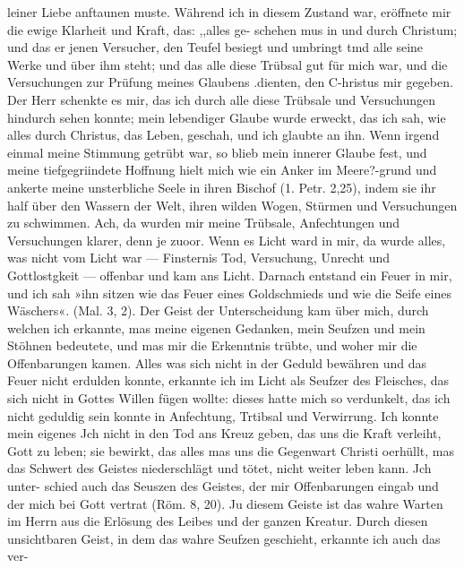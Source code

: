 leiner Liebe anftaunen muste. Während ich in diesem Zustand
war, eröffnete mir die ewige Klarheit und Kraft, das: ,,alles ge-
schehen mus in und durch Christum; und das er jenen Versucher,
den Teufel besiegt und umbringt tmd alle seine Werke und über
ihm steht; und das alle diese Trübsal gut für mich war, und
die Versuchungen zur Prüfung meines Glaubens .dienten, den
C-hristus mir gegeben. Der Herr schenkte es mir, das ich durch
alle diese Trübsale und Versuchungen hindurch sehen konnte;
mein lebendiger Glaube wurde erweckt, das ich sah, wie alles
durch Christus, das Leben, geschah, und ich glaubte an ihn. Wenn
irgend einmal meine Stimmung getrübt war, so blieb mein innerer
Glaube fest, und meine tiefgegriindete Hoffnung hielt mich wie
ein Anker im Meere?-grund und ankerte meine unsterbliche Seele
in ihren Bischof (1. Petr. 2,25), indem sie ihr half über den Wassern
der Welt, ihren wilden Wogen, Stürmen und Versuchungen zu
schwimmen. Ach, da wurden mir meine Trübsale, Anfechtungen
und Versuchungen klarer, denn je zuoor. Wenn es Licht ward
in mir, da wurde alles, was nicht vom Licht war — Finsternis
Tod, Versuchung, Unrecht und Gottlostgkeit — offenbar und kam
ans Licht. Darnach entstand ein Feuer in mir, und ich sah »ihn
sitzen wie das Feuer eines Goldschmieds und wie die Seife eines
Wäschers«. (Mal. 3, 2). Der Geist der Unterscheidung kam über
mich, durch welchen ich erkannte, mas meine eigenen Gedanken,
mein Seufzen und mein Stöhnen bedeutete, und mas mir die
Erkenntnis trübte, und woher mir die Offenbarungen kamen.
Alles was sich nicht in der Geduld bewähren und das Feuer
nicht erdulden konnte, erkannte ich im Licht als Seufzer des
Fleisches, das sich nicht in Gottes Willen fügen wollte: dieses
hatte mich so verdunkelt, das ich nicht geduldig sein konnte in
Anfechtung, Trtibsal und Verwirrung. Ich konnte mein eigenes
Jch nicht in den Tod ans Kreuz geben, das uns die Kraft
verleiht, Gott zu leben; sie bewirkt, das alles mas uns
die Gegenwart Christi oerhüllt, mas das Schwert des Geistes
niederschlägt und tötet, nicht weiter leben kann. Jch unter-
schied auch das Seuszen des Geistes, der mir Offenbarungen
eingab und der mich bei Gott vertrat (Röm. 8, 20). Ju diesem
Geiste ist das wahre Warten im Herrn aus die Erlösung des
Leibes und der ganzen Kreatur. Durch diesen unsichtbaren Geist,
in dem das wahre Seufzen geschieht, erkannte ich auch das ver-





